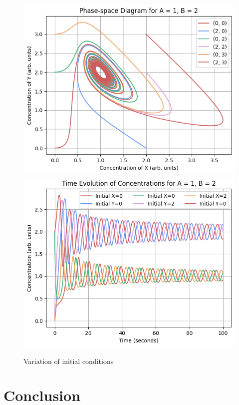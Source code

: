 \documentclass[reprint, amsmath, amssymb, aps]{revtex4-2}
\begin{document}
\begin{figure}
\includegraphics[width=0.85\columnwidth]{variationOfInitialConditions_phase.png}
\includegraphics[width=0.85\columnwidth]{variationOfInitialConditions_evolution.png}
\caption{\label{fig:combinedPlot}Variation of initial conditions}
\end{figure}

\section{Conclusion}

\clearpage


\clearpage
\end{document}
